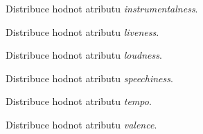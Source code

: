 \documentclass[thesis=B, czech]{FITthesis}[2019/03/06]
\begin{document}
\begin{figure}[b]
\def\svgwidth{1.0\textwidth}
    \centering
    
        \caption[]{
         Distribuce hodnot atributu \textit{instrumentalness}.}
    \label{fig:instrumentalness}
\end{figure}

\begin{figure}[b]
\def\svgwidth{1.0\textwidth}
    \centering
    
        \caption[]{
        Distribuce hodnot atributu \textit{liveness}.}
    \label{fig:liveness}
\end{figure}

\begin{figure}[b]
\def\svgwidth{1.0\textwidth}
    \centering
    
        \caption[]{
         Distribuce hodnot atributu \textit{loudness}.}
    \label{fig:loudness}
\end{figure}

\begin{figure}[b]
\def\svgwidth{1.0\textwidth}
    \centering
    
        \caption[]{
         Distribuce hodnot atributu \textit{speechiness}.}
    \label{fig:speechiness}
\end{figure}

\begin{figure}[b]
\def\svgwidth{1.0\textwidth}
    \centering
    
        \caption[]{
         Distribuce hodnot atributu \textit{tempo}.}
    \label{fig:tempo}
\end{figure}

\begin{figure}[b]
\def\svgwidth{1.0\textwidth}
    \centering
    
        \caption[]{
         Distribuce hodnot atributu \textit{valence}.}
    \label{fig:valence}
\end{figure}
\end{document}
